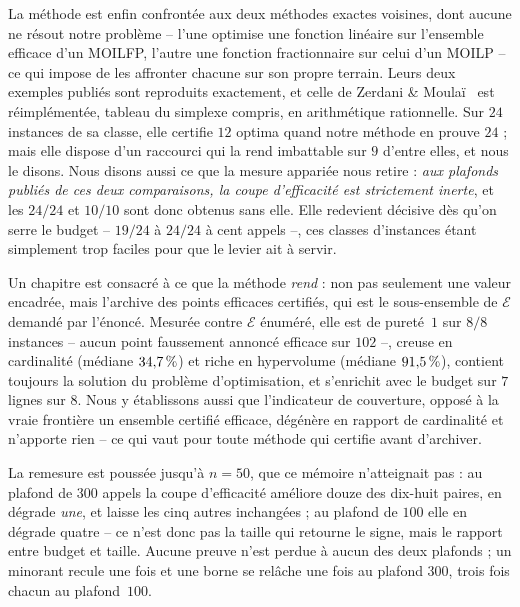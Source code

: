 \documentclass[11pt,a4paper]{article}
\theoremstyle{plain}
\theoremstyle{remark}
\newcommand{\Ecal}{\mathcal{E}}
\begin{document}
La méthode est enfin confrontée aux deux méthodes exactes voisines, dont
aucune ne résout notre problème -- l'une optimise une fonction linéaire sur
l'ensemble efficace d'un MOILFP, l'autre une fonction fractionnaire sur
celui d'un MOILP -- ce qui impose de les affronter chacune sur son propre
terrain. Leurs deux exemples publiés sont reproduits exactement, et celle de
Zerdani \& Moulaï~\cite{zerdani2011} est réimplémentée, tableau du simplexe
compris, en
arithmétique rationnelle. Sur $24$ instances de sa classe, elle certifie
$12$ optima quand notre méthode en prouve $24$ ; mais elle dispose d'un
raccourci qui la rend imbattable sur $9$ d'entre elles, et nous le disons.
Nous disons aussi ce que la mesure appariée nous retire : \emph{aux plafonds
publiés de ces deux comparaisons, la coupe d'efficacité est strictement
inerte}, et les $24/24$ et $10/10$ sont donc obtenus sans elle. Elle
redevient décisive dès qu'on serre le budget -- $19/24$ à $24/24$ à cent
appels --, ces classes d'instances étant simplement trop faciles pour que le
levier ait à servir.

Un chapitre est consacré à ce que la méthode \emph{rend} : non pas
seulement une valeur encadrée, mais l'archive des points efficaces
certifiés, qui est le sous-ensemble de $\Ecal$ demandé par l'énoncé.
Mesurée contre $\Ecal$ énuméré, elle est de pureté~$1$ sur $8/8$ instances -- aucun
point faussement annoncé efficace sur $102$ --, creuse en cardinalité
(médiane $34{,}7{}\,\%$) et riche en hypervolume (médiane $91{,}5{}\,\%$),
contient toujours la solution du problème d'optimisation, et s'enrichit avec
le budget sur $7$ lignes sur $8$. Nous y établissons aussi que l'indicateur
de couverture, opposé à la vraie frontière un ensemble certifié efficace,
dégénère en rapport de cardinalité et n'apporte rien -- ce qui vaut pour
toute méthode qui certifie avant d'archiver.

La remesure est poussée jusqu'à $n=50$, que ce mémoire n'atteignait pas : au
plafond de $300$ appels la coupe d'efficacité améliore douze des dix-huit
paires, en dégrade \emph{une}, et laisse les cinq autres inchangées ; au
plafond de $100$ elle en dégrade quatre -- ce n'est donc pas la taille qui
retourne le signe, mais le rapport entre budget et taille. Aucune preuve
n'est perdue à aucun des deux plafonds ; un minorant recule une fois et une
borne se relâche une fois au plafond $300$, trois fois chacun au
plafond~$100$.
\end{document}
